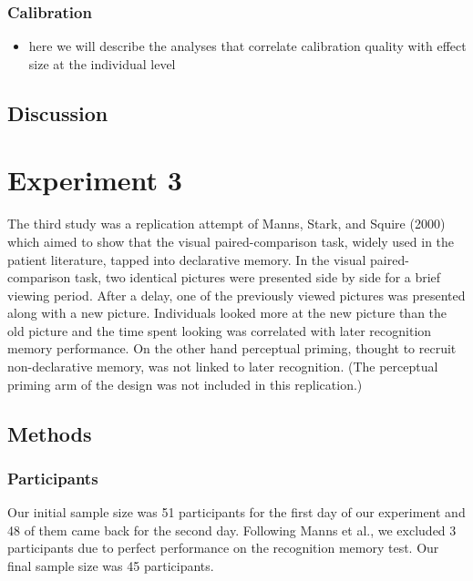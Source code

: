 \documentclass[
  english,
  man,floatsintext]{apa6}
\providecommand{\tightlist}{%
  \setlength{\itemsep}{0pt}\setlength{\parskip}{0pt}}
\begin{document}
\hypertarget{calibration-1}{%
\subsubsection{Calibration}\label{calibration-1}}

\begin{itemize}
\tightlist
\item
  here we will describe the analyses that correlate calibration quality with effect size at the individual level
\end{itemize}

\hypertarget{discussion-1}{%
\subsection{Discussion}\label{discussion-1}}

\hypertarget{experiment-3}{%
\section{Experiment 3}\label{experiment-3}}

The third study was a replication attempt of Manns, Stark, and Squire (2000) which aimed to show that the visual paired-comparison task, widely used in the patient literature, tapped into declarative memory. In the visual paired-comparison task, two identical pictures were presented side by side for a brief viewing period. After a delay, one of the previously viewed pictures was presented along with a new picture. Individuals looked more at the new picture than the old picture and the time spent looking was correlated with later recognition memory performance. On the other hand perceptual priming, thought to recruit non-declarative memory, was not linked to later recognition. (The perceptual priming arm of the design was not included in this replication.)

\hypertarget{methods-2}{%
\subsection{Methods}\label{methods-2}}

\hypertarget{participants-3}{%
\subsubsection{Participants}\label{participants-3}}

Our initial sample size was 51 participants for the first day of our experiment and 48 of them came back for the second day. Following Manns et al., we excluded 3 participants due to perfect performance on the recognition memory test. Our final sample size was 45 participants.
\end{document}

